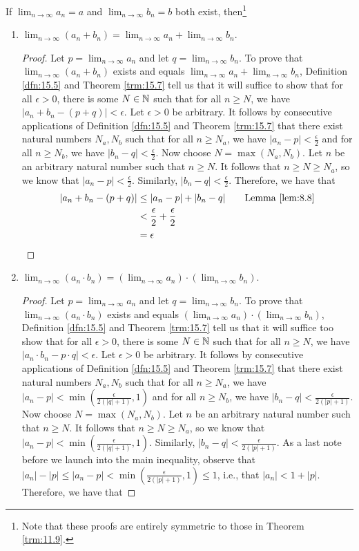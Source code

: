 \documentclass[../main.tex]{subfiles}
\begin{document}
\begin{theorem}\label{trm:15.9}
    If $\lim_{n\to\infty}a_n=a$ and $\lim_{n\to\infty}b_n=b$ both exist, then\footnote{Note that these proofs are entirely symmetric to those in Theorem \ref{trm:11.9}.}
    \begin{enumerate}[label={\textup{(}\alph*\textup{)}}]
        \item $\lim_{n\to\infty}(a_n+b_n)=\lim_{n\to\infty}a_n+\lim_{n\to\infty}b_n$.
        \begin{proof}
            Let $p=\lim_{n\to\infty}a_n$ and let $q=\lim_{n\to\infty}b_n$. To prove that $\lim_{n\to\infty}(a_n+b_n)$ exists and equals $\lim_{n\to\infty}a_n+\lim_{n\to\infty}b_n$, Definition \ref{dfn:15.5} and Theorem \ref{trm:15.7} tell us that it will suffice to show that for all $\epsilon>0$, there is some $N\in\mathbb{N}$ such that for all $n\geq N$, we have $|a_n+b_n-(p+q)|<\epsilon$. Let $\epsilon>0$ be arbitrary. It follows by consecutive applications of Definition \ref{dfn:15.5} and Theorem \ref{trm:15.7} that there exist natural numbers $N_a,N_b$ such that for all $n\geq N_a$, we have $|a_n-p|<\frac{\epsilon}{2}$ and for all $n\geq N_b$, we have $|b_n-q|<\frac{\epsilon}{2}$. Now choose $N=\max(N_a,N_b)$. Let $n$ be an arbitrary natural number such that $n\geq N$. It follows that $n\geq N\geq N_a$, so we know that $|a_n-p|<\frac{\epsilon}{2}$. Similarly, $|b_n-q|<\frac{\epsilon}{2}$. Therefore, we have that
            \begin{align*}
                |a_n+b_n-(p+q)| &\leq |a_n-p|+|b_n-q|\tag*{Lemma \ref{lem:8.8}}\\
                &< \frac{\epsilon}{2}+\frac{\epsilon}{2}\\
                &= \epsilon
            \end{align*}
        \end{proof}
        \item $\lim_{n\to\infty}(a_n\cdot b_n)=\left( \lim_{n\to\infty}a_n \right)\cdot\left( \lim_{n\to\infty}b_n \right)$.
        \begin{proof}
            Let $p=\lim_{n\to\infty}a_n$ and let $q=\lim_{n\to\infty}b_n$. To prove that $\lim_{n\to\infty}(a_n\cdot b_n)$ exists and equals $\left( \lim_{n\to\infty}a_n \right)\cdot\left( \lim_{n\to\infty}b_n \right)$, Definition \ref{dfn:15.5} and Theorem \ref{trm:15.7} tell us that it will suffice too show that for all $\epsilon>0$, there is some $N\in\mathbb{N}$ such that for all $n\geq N$, we have $|a_n\cdot b_n-p\cdot q|<\epsilon$. Let $\epsilon>0$ be arbitrary. It follows by consecutive applications of Definition \ref{dfn:15.5} and Theorem \ref{trm:15.7} that there exist natural numbers $N_a,N_b$ such that for all $n\geq N_a$, we have $|a_n-p|<\min(\frac{\epsilon}{2(|q|+1)},1)$ and for all $n\geq N_b$, we have $|b_n-q|<\frac{\epsilon}{2(|p|+1)}$. Now choose $N=\max(N_a,N_b)$. Let $n$ be an arbitrary natural number such that $n\geq N$. It follows that $n\geq N\geq N_a$, so we know that $|a_n-p|<\min(\frac{\epsilon}{2(|q|+1)},1)$. Similarly, $|b_n-q|<\frac{\epsilon}{2(|p|+1)}$. As a last note before we launch into the main inequality, observe that $|a_n|-|p|\leq |a_n-p|<\min(\frac{\epsilon}{2(|p|+1)},1)\leq 1$, i.e., that $|a_n|<1+|p|$. Therefore, we have that

\end{proof}
\end{enumerate}
\end{theorem}
\end{document}
